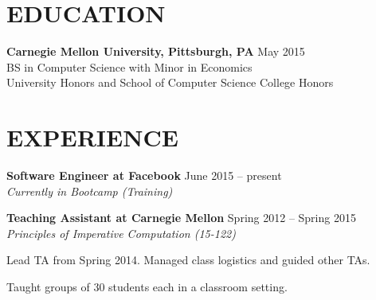 \documentclass[margin, 11pt]{res} %
\begin{document}
\begin{resume}


\section{EDUCATION}

{\bf Carnegie Mellon University, Pittsburgh, PA} \hfill {\small May 2015}\\
{\small BS in Computer Science with Minor in Economics} \\
{\small University Honors and School of Computer Science College Honors}



\section{EXPERIENCE}

{\bf Software Engineer at Facebook} \hfill {\small June 2015 -- present}\\
{\small {\sl Currently in Bootcamp (Training)}}

\vspace{5pt}

{\bf Teaching Assistant at Carnegie Mellon} \hfill {\small Spring 2012 -- Spring 2015}\\
{\small {\sl Principles of Imperative Computation (15-122)}}

\begin{itemize} \itemsep -2pt
{\small \item Lead TA from Spring 2014. Managed class logistics and guided other TAs.
\item Taught groups of 30 students each in a classroom setting.}
\end{itemize}


\end{resume}
\end{document}
